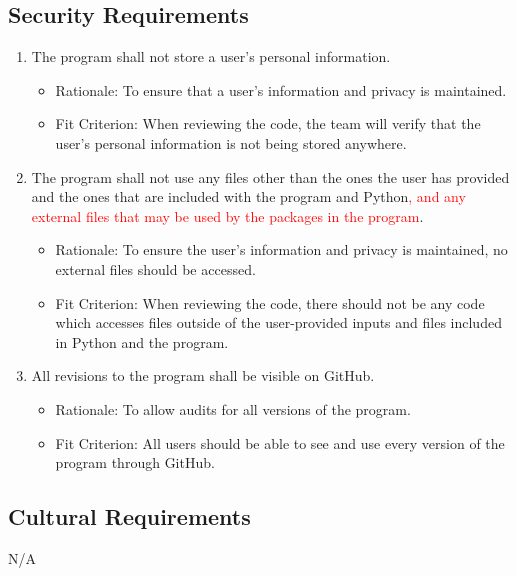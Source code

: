 \documentclass[12pt, titlepage]{article}
\begin{document}
\subsection{Security Requirements}
\begin{enumerate}[{SR}1. ]
\item \label{SR1} The program shall not store a user's personal information.
    \begin{itemize} 
        \item Rationale: To ensure that a user's information and privacy is maintained.
        \item Fit Criterion: When reviewing the code, the team will verify that the user's personal information is not being stored anywhere. 
    \end{itemize} 
\item \label{SR2} The program shall not use any files other than the ones the user has provided and the ones that are included with the program and Python\textcolor{red}{, and any external files that may be used by the packages in the program}.
    \begin{itemize} 
        \item Rationale: To ensure the user's information and privacy is maintained, no external files should be accessed.
        \item Fit Criterion: When reviewing the code, there should not be any code which accesses files outside of the user-provided inputs and files included in Python and the program.
    \end{itemize}
\item \label{SR3} All revisions to the program shall be visible on GitHub.
    \begin{itemize} 
        \item Rationale: To allow audits for all versions of the program.
        \item Fit Criterion: All users should be able to see and use every version of the program through GitHub.
    \end{itemize} 
\end{enumerate}

\subsection{Cultural Requirements}
N/A
\end{document}
